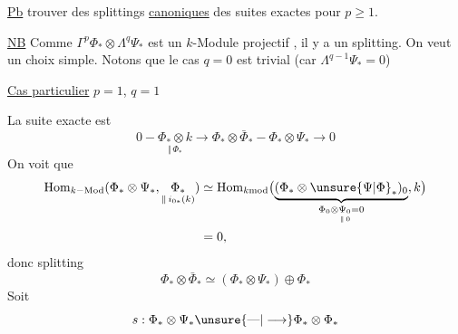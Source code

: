 \uline{Pb} trouver des splittings \uline{canoniques} des suites exactes
pour $p\geq1$.

\uline{NB} Comme $\Gamma^p\Phi_*\otimes\Lambda^q\Psi_*$ est un $k$-Module projectif ,
il y a un splitting. On veut un choix simple. Notons que le cas $q=0$ est trivial (car $\Lambda^{q-1}\Psi_*=0$)

\uline{Cas particulier} $p=1$, $q=1$

La suite exacte est
\[
0-\underset{\Vert\,\Phi_*}{\Phi_*\otimes k}
\longrightarrow\Phi_*\otimes\bar\Phi_*-\Phi_*\otimes\Psi_*\longrightarrow0
\]
On voit que
\[
\begin{aligned}
\operatorname{Hom}_{k-\mathrm{Mod}}(\Phi_*\otimes\Psi_*,
\underset{\Vert\,i_{0*}(k)}{\Phi_*})
&\simeq\operatorname{Hom}_{k\mathrm{mod}}
\bigl(\underbrace{(\Phi_*\otimes\unsure{\Psi|\Phi}_*)_0}_{\Phi_0\otimes\underset{\Vert\,0}{\Psi_0}=0},k\bigr)\\
&=0,
\end{aligned}
\]
donc splitting 
\[
\Phi_*\otimes\bar\Phi_*\simeq(\Phi_*\otimes\Psi_*)\oplus\Phi_*
\]
Soit 
\[
s:\Phi_*\otimes\Psi_*\unsure{\text{---}|\longrightarrow}\Phi_*\otimes\Phi_*
\]
